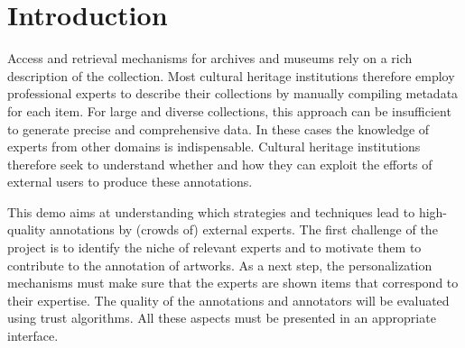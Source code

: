 \section{Introduction}\label{introduction}
Access and retrieval mechanisms for archives and museums rely on a rich description of the collection. 
Most cultural heritage institutions therefore employ professional experts to describe their collections by manually compiling metadata for each item. 
For large and diverse collections, this approach can be insufficient to generate precise and comprehensive data. 
In these cases the knowledge of experts from other domains is indispensable.  
Cultural heritage institutions therefore seek to understand whether and how they can exploit the efforts of external users to produce these annotations.

This demo aims at understanding which strategies and techniques lead to high-quality annotations by (crowds of) external experts. 
The first challenge of the project is to identify the niche of relevant experts and to motivate them to contribute to the annotation of artworks. 
As a next step, the personalization mechanisms must make sure that the experts are shown items that correspond to their expertise. 
The quality of the annotations and annotators will be evaluated using trust algorithms. 
All these aspects must be presented in an appropriate interface.

